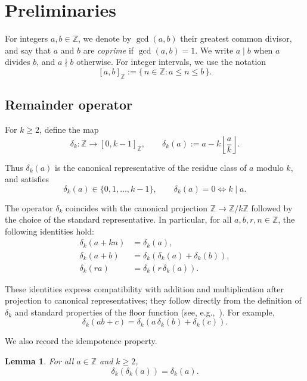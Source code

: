 \documentclass[12pt]{article}
\newtheorem{lemma}[theorem]{Lemma}
\begin{document}
\section{Preliminaries}\label{sec:preliminaries}

For integers $a,b \in \mathbb{Z}$, we denote by $\gcd(a,b)$ their greatest 
common divisor, and say that $a$ and $b$ are \emph{coprime} if $\gcd(a,b)=1$. 
We write $a \mid b$ when $a$ divides $b$, and $a \nmid b$ otherwise. For 
integer intervals, we use the notation
\[
[a,b]_{\mathbb{Z}} := \{\, n \in \mathbb{Z} : a \le n \le b \,\}.
\]

\subsection{Remainder operator}

For $k \ge 2$, define the map
\[
\delta_k : \mathbb{Z} \to [0,k-1]_{\mathbb{Z}},
\qquad
\delta_k(a) := a - k \left\lfloor \frac{a}{k} \right\rfloor .
\]

Thus $\delta_k(a)$ is the canonical representative of the residue class of $a$ 
modulo $k$, and satisfies
\[
\delta_k(a) \in \{0,1,\dots,k-1\},
\qquad
\delta_k(a)=0 \iff k \mid a.
\]

The operator $\delta_k$ coincides with the canonical projection 
$\mathbb{Z} \to \mathbb{Z}/k\mathbb{Z}$ followed by the choice of the standard 
representative. In particular, for all $a,b,r,n \in \mathbb{Z}$, the following 
identities hold:
\begin{align}
\delta_k(a+kn) &= \delta_k(a), \label{eq:period}\\
\delta_k(a+b)  &= \delta_k\!\left(\delta_k(a)+\delta_k(b)\right),
                \label{eq:addcomp}\\
\delta_k(ra)   &= \delta_k\!\left(r\,\delta_k(a)\right).
                \label{eq:multcomp}
\end{align}

These identities express compatibility with addition and multiplication 
after projection to canonical representatives; they follow directly from 
the definition of $\delta_k$ and standard properties of the floor function 
(see, e.g.,~\cite{HardyWright2008}). For example,
\[
\delta_k(ab+c) = \delta_k\!\left(a\,\delta_k(b)+\delta_k(c)\right).
\]

We also record the idempotence property.

\begin{lemma}\label{lem:idempotent}
For all $a \in \mathbb{Z}$ and $k \ge 2$,
\[
\delta_k(\delta_k(a))=\delta_k(a).
\]
\end{lemma}
\end{document}
